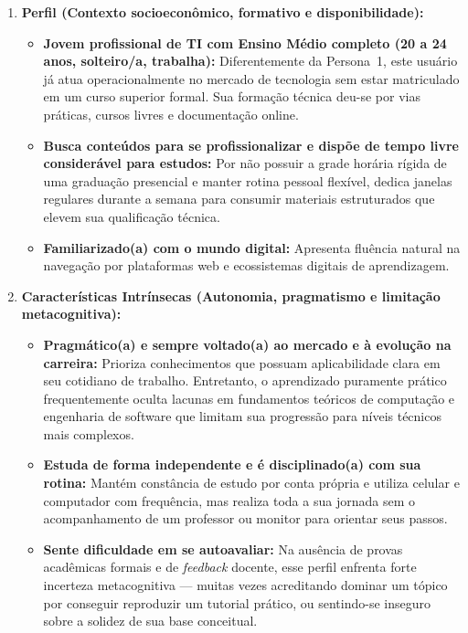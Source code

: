 \begin{enumerate}
    \item \textbf{Perfil (Contexto socioeconômico, formativo e disponibilidade):}
    \begin{itemize}
        \item \textbf{Jovem profissional de TI com Ensino Médio completo (20 a 24 anos, solteiro/a, trabalha):} Diferentemente da Persona~1, este usuário já atua operacionalmente no mercado de tecnologia sem estar matriculado em um curso superior formal. Sua formação técnica deu-se por vias práticas, cursos livres e documentação online.
        \item \textbf{Busca conteúdos para se profissionalizar e dispõe de tempo livre considerável para estudos:} Por não possuir a grade horária rígida de uma graduação presencial e manter rotina pessoal flexível, dedica janelas regulares durante a semana para consumir materiais estruturados que elevem sua qualificação técnica.
        \item \textbf{Familiarizado(a) com o mundo digital:} Apresenta fluência natural na navegação por plataformas web e ecossistemas digitais de aprendizagem.
    \end{itemize}

    \item \textbf{Características Intrínsecas (Autonomia, pragmatismo e limitação metacognitiva):}
    \begin{itemize}
        \item \textbf{Pragmático(a) e sempre voltado(a) ao mercado e à evolução na carreira:} Prioriza conhecimentos que possuam aplicabilidade clara em seu cotidiano de trabalho. Entretanto, o aprendizado puramente prático frequentemente oculta lacunas em fundamentos teóricos de computação e engenharia de software que limitam sua progressão para níveis técnicos mais complexos.
        \item \textbf{Estuda de forma independente e é disciplinado(a) com sua rotina:} Mantém constância de estudo por conta própria e utiliza celular e computador com frequência, mas realiza toda a sua jornada sem o acompanhamento de um professor ou monitor para orientar seus passos.
        \item \textbf{Sente dificuldade em se autoavaliar:} Na ausência de provas acadêmicas formais e de \textit{feedback} docente, esse perfil enfrenta forte incerteza metacognitiva — muitas vezes acreditando dominar um tópico por conseguir reproduzir um tutorial prático, ou sentindo-se inseguro sobre a solidez de sua base conceitual.
    \end{itemize}


\end{enumerate}
